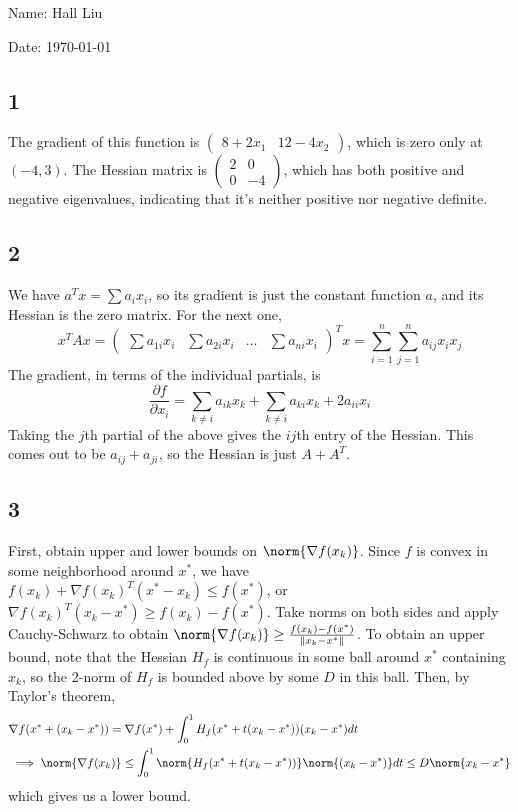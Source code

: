 \documentclass{article}
\newcommand{\dd}{\partial}
\newcommand{\openm}{\begin{pmatrix}}
\newcommand{\closem}{\end{pmatrix}}
\begin{document}
Name: Hall Liu

Date: \today 

\subsection*{1}
The gradient of this function is $\openm 8+2x_1&12-4x_2\closem$, which is zero only at $(-4,3)$. The Hessian matrix is $\openm 2&0\\0&-4\closem$, which has both positive and negative eigenvalues, indicating that it's neither positive nor negative definite.
\vspace{6cm}
\subsection*{2}
We have $a^Tx=\sum a_ix_i$, so its gradient is just the constant function $a$, and its Hessian is the zero matrix. For the next one, 
\[x^TAx=\openm\sum a_{1i}x_i&\sum a_{2i}x_i&\hdots&\sum a_{ni}x_i\closem^Tx=\sum_{i=1}^n\sum_{j=1}^na_{ij}x_ix_j\]
The gradient, in terms of the individual partials, is 
\[\frac{\dd f}{\dd x_i}=\sum_{k\neq i}a_{ik}x_k+\sum_{k\neq i}a_{ki}x_k+2a_{ii}x_i\]
Taking the $j$th partial of the above gives the $ij$th entry of the Hessian. This comes out to be $a_{ij}+a_{ji}$, so the Hessian is just $A+A^T$.
\subsection*{3}
First, obtain upper and lower bounds on $\norm{\nabla f(x_k)}$. Since $f$ is convex in some neighborhood around $x^*$, we have $f(x_k)+\nabla f(x_k)^T(x^*-x_k)\leq f(x^*)$, or $\nabla f(x_k)^T(x_k-x^*)\geq f(x_k)-f(x^*)$. Take norms on both sides and apply Cauchy-Schwarz to obtain $\norm{\nabla f(x_k)}\geq \frac{f(x_k)-f(x^*)}{\|x_k-x^*\|}$. To obtain an upper bound, note that the Hessian $H_f$ is continuous in some ball around $x^*$ containing $x_k$, so the 2-norm of $H_f$ is bounded above by some $D$ in this ball. Then, by Taylor's theorem, 
\begin{align*}
    &\nabla f(x^*+(x_k-x^*))=\nabla f(x^*)+\int_0^1 H_f(x^*+t(x_k-x^*))(x_k-x^*)dt\\
    &\implies \norm{\nabla f(x_k)}\leq\int_0^1\norm{H_f(x^*+t(x_k-x^*))}\norm{(x_k-x^*)}dt\leq D\norm{x_k-x^*}
\end{align*}
which gives us a lower bound.
\end{document}
